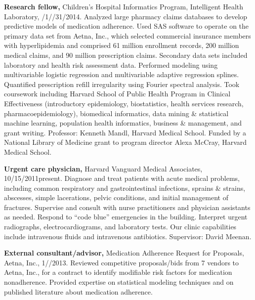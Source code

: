 \documentclass[10pt]{article}
\begin{document}
\textbf{Research fellow,} Children’s Hospital Informatics Program,
Intelligent Health Lab\-o\-ra\-to\-ry,
/1/\ndash{}/31/2014.
Analyzed large pharmacy claims databases to develop predictive models
of medication adherence. Used SAS software to operate on the primary
data set from Aetna, Inc., which selected commercial insurance members
with hyperlipidemia and comprised 61 million enrollment records, 200
million medical claims, and 90 million prescription claims. Secondary
data sets included laboratory and health risk assessment data.
Performed modeling using multivariable logistic regression and
multivariable adaptive regression splines. Quantified prescription
refill irregularity using Fourier spectral analysis. Took coursework
including Harvard School of Public Health Program in Clinical
Effectiveness (introductory epidemiology, biostatistics, health
services research, pharmacoepidemiology), biomedical informatics, data
mining \& statistical machine learning, population health informatics,
business \& management, and grant writing. Professor: Kenneth Mandl,
Harvard Medical School. Funded by a National Library of Medicine grant
to program director Alexa McCray, Harvard Medical School.

\textbf{Urgent care physician,} Harvard Vanguard Medical Associates,
10/15/2011\ndash{}present. Diagnose and treat patients with acute
medical problems, including common respiratory and gastrointestinal
infections, sprains \& strains, abscesses, simple lacerations, pelvic
conditions, and initial management of fractures. Supervise and consult
with nurse practitioners and physician assistants as needed. Respond
to “code blue” emergencies in the building. Interpret urgent
radiographs, electrocardiograms, and laboratory tests. Our clinic
capabilities include intravenous fluids and intravenous antibiotics.
Supervisor: David Meenan.

\textbf{External consultant/advisor,} Medication Adherence Request for
Proposals, Aetna, Inc.,
1/\ndash{}/2013. Reviewed competitive
proposals/bids from 7 vendors to Aetna, Inc., for a contract to
identify modifiable risk factors for medication nonadherence. Provided
expertise on statistical modeling techniques and on published
literature about medication adherence.
\end{document}
